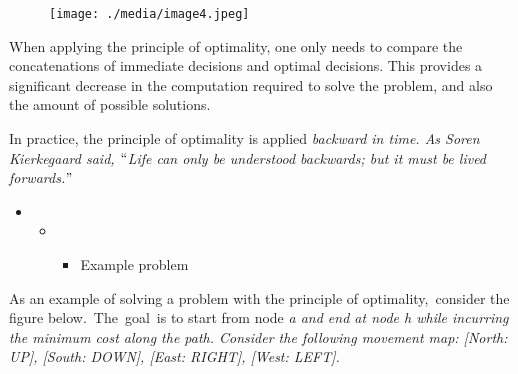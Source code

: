 \documentclass[12pt,twoside]{article}
\begin{document}

\begin{figure}[H]
	\begin{Center}
		\texttt{[image: ./media/image4.jpeg]}
	\end{Center}
\end{figure}



{\fontsize{10pt}{12.0pt}\selectfont \par}\par


\vspace{\baselineskip}

\vspace{\baselineskip}
{\fontsize{10pt}{12.0pt}\selectfont When applying the principle of optimality, one only needs to compare the concatenations of immediate decisions and optimal decisions. This provides a significant decrease in the computation required to solve the problem, and also the amount of possible solutions.\par}\par

{\fontsize{10pt}{12.0pt}\selectfont In practice, the principle of optimality is applied \textit{backward in time. As Soren Kierkegaard said, $``$Life can only be understood backwards; but it must be lived forwards.$"$ }\par}\par


\vspace{\baselineskip}

\vspace{\baselineskip}
\begin{itemize}
	\item \begin{itemize}
	\item \begin{itemize}
	\item Example problem
\end{itemize}
\end{itemize}
\end{itemize}\par


\vspace{\baselineskip}
\begin{adjustwidth}{0.08in}{0.58in}
{\fontsize{10pt}{12.0pt}\selectfont As an example of solving a problem with the principle of optimality,\  consider the figure below.\  The\ goal\   is to start from node \textit{a and end at node h while incurring the minimum cost along the path. Consider the following movement map: [North: UP], [South: DOWN], [East: RIGHT], [West: LEFT].}\par}\par

\end{adjustwidth}
\end{document}
